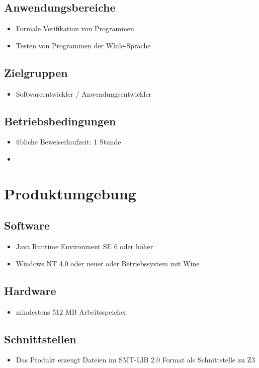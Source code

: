 \documentclass[a4paper,10pt]{article}
\begin{document}
\subsection{Anwendungsbereiche}
\begin{itemize}
  \item Formale Verifikation von Programmen
  \item Testen von Programmen der While-Sprache
\end{itemize}

\subsection{Zielgruppen}
\begin{itemize}
  \item Softwareentwickler / Anwendungsentwickler
\end{itemize}

\subsection{Betriebsbedingungen}
\begin{itemize}
  \item \"{u}bliche Beweiserlaufzeit: 1 Stunde
  \item 
\end{itemize}

\section{Produktumgebung}
\subsection{Software}
\begin{itemize}
  \item Java Runtime Environment SE 6 oder h\"{o}her
  \item Windows NT 4.0 oder neuer oder Betriebssystem mit Wine
\end{itemize}

\subsection{Hardware}
\begin{itemize}
  \item mindestens 512 MB Arbeitsspeicher
\end{itemize}

\subsection{Schnittstellen}
\begin{itemize}
  \item Das Produkt erzeugt Dateien im SMT-LIB 2.0 Format als Schnittstelle zu Z3
\end{itemize}
\end{document}
